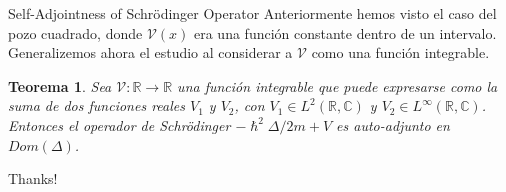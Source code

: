 \documentclass[aspectratio=1610]{beamer}
\newcommand*{\field}[1]{\mathbb{#1}}
\newtheorem*{teo}{Teorema}
\begin{document}
\begin{frame}{Self-Adjointness of Schrödinger Operator}
Anteriormente hemos visto el caso del pozo cuadrado, donde $\mathcal{V}(x)$ era una función constante dentro de un intervalo. Generalizemos ahora el estudio al considerar a $\mathcal{V}$ como una función integrable.
\begin{teo}
    Sea $\mathcal{V}:\field{R}\longrightarrow\field{R}$ una función integrable que puede expresarse como la suma de dos funciones reales $V_{1}$ y $V_{2}$, con $V_{1}\in L^{2}(\field{R},\field{C})$ y $V_{2}\in L^{\infty}(\field{R},\field{C})$. Entonces el operador de Schrödinger $-\hslash^2 \Delta/2m + V$ es auto-adjunto en $Dom(\Delta)$.
    \label{teo:SCOperator}
\end{teo}
    
\end{frame}



\begin{frame}
\vspace{1cm}
\Huge{\centerline{Thanks!}}
\end{frame}
\end{document}
